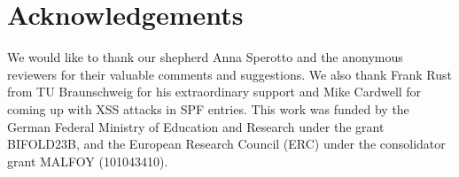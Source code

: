 \section*{Acknowledgements}
We would like to thank our shepherd Anna Sperotto and the anonymous reviewers for their valuable comments and suggestions.
We also thank Frank Rust from TU Braunschweig for his extraordinary support and Mike Cardwell for coming up with XSS attacks in SPF entries.
This work was funded by the German Federal Ministry of Education and Research under the grant BIFOLD23B, and the European Research Council (ERC) under the consolidator grant MALFOY (101043410).
